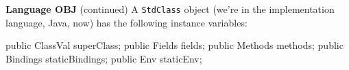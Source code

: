 \begin{minipage}[t]{\sw}
\slidenumber
\LARGE
{\bf Language OBJ} (continued)\exx
A \verb'StdClass' object (we're in the implementation language, Java, now)
has the following instance variables:
\begin{qv}
    public ClassVal superClass;
    public Fields fields;
    public Methods methods;
    public Bindings staticBindings; 
    public Env staticEnv;
\end{qv}
\end{minipage}
